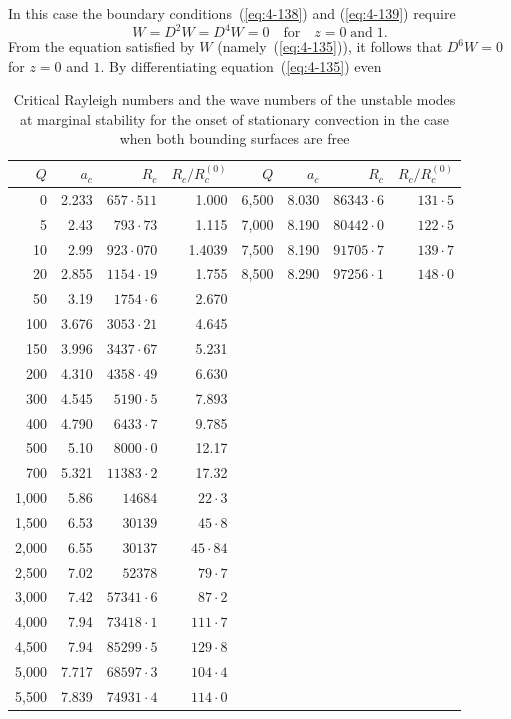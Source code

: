 In this case the boundary conditions~(\ref{eq:4-138}) and (\ref{eq:4-139}) require
\begin{equation}
\label{eq:4-161}
W = D^2 W = D^4 W = 0 \quad \text{for}\quad z = 0\;\text{and}\;1.
\end{equation}
From the equation satisfied by $W$ (namely~(\ref{eq:4-135})), it follows that $D^6 W=0$ for $z=0$ and $1$. By differentiating equation~(\ref{eq:4-135}) even
%
\begin{table}[t]
\centering
\caption{Critical Rayleigh numbers and the wave numbers of the unstable modes at marginal stability for the onset of stationary convection in the case when both bounding surfaces are free}
\label{tab:XIV}
\smallskip
\begin{tabular}{r@{\quad}r@{\quad}r@{\quad}r@{\quad}r@{\quad}r@{\quad}r@{\quad}r}
\hline
$Q$ & $a_c$ & $R_c$ & $R_c/R_c^{(0)}$ & $Q$ & $a_c$ & $R_c$ & $R_c/R_c^{(0)}$ \\
\hline
0 & 2.233 & $657{\cdot}511$ & 1.000 & 6{,}500 & 8.030 & $86343{\cdot}6$ & $131{\cdot}5$ \\
5 & 2.43 & $793{\cdot}73$ & 1.115 & 7{,}000 & 8.190 & $80442{\cdot}0$ & $122{\cdot}5$ \\
10 & 2.99 & $923{\cdot}070$ & 1.4039 & 7{,}500 & 8.190 & $91705{\cdot}7$ & $139{\cdot}7$ \\
20 & 2.855 & $1154{\cdot}19$ & 1.755 & 8{,}500 & 8.290 & $97256{\cdot}1$ & $148{\cdot}0$ \\
50 & 3.19 & $1754{\cdot}6$ & 2.670 & & & & \\
100 & 3.676 & $3053{\cdot}21$ & 4.645 & & & & \\
150 & 3.996 & $3437{\cdot}67$ & 5.231 & & & & \\
200 & 4.310 & $4358{\cdot}49$ & 6.630 & & & & \\
300 & 4.545 & $5190{\cdot}5$ & 7.893 & & & & \\
400 & 4.790 & $6433{\cdot}7$ & 9.785 & & & & \\
500 & 5.10 & $8000{\cdot}0$ & 12.17 & & & & \\
700 & 5.321 & $11383{\cdot}2$ & 17.32 & & & & \\
1{,}000 & 5.86 & $14684$ & $22{\cdot}3$ & & & & \\
1{,}500 & 6.53 & $30139$ & $45{\cdot}8$ & & & & \\
2{,}000 & 6.55 & $30137$ & $45{\cdot}84$ & & & & \\
2{,}500 & 7.02 & $52378$ & $79{\cdot}7$ & & & & \\
3{,}000 & 7.42 & $57341{\cdot}6$ & $87{\cdot}2$ & & & & \\
4{,}000 & 7.94 & $73418{\cdot}1$ & $111{\cdot}7$ & & & & \\
4{,}500 & 7.94 & $85299{\cdot}5$ & $129{\cdot}8$ & & & & \\
5{,}000 & 7.717 & $68597{\cdot}3$ & $104{\cdot}4$ & & & & \\
5{,}500 & 7.839 & $74931{\cdot}4$ & $114{\cdot}0$ & & & & \\
\hline
\end{tabular}
\end{table}
